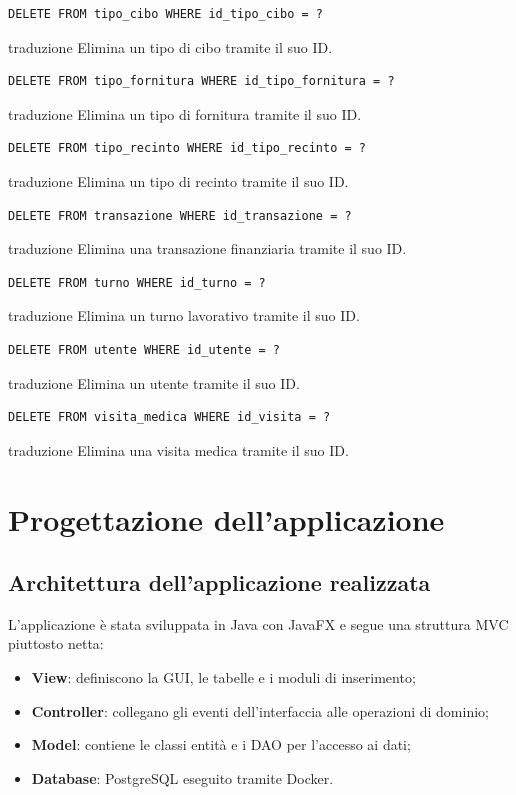 \documentclass[12pt,a4paper]{report}
\begin{document}
\begin{lstlisting}[style=sqlstyle]
DELETE FROM tipo_cibo WHERE id_tipo_cibo = ?
\end{lstlisting}
traduzione {Elimina un tipo di cibo tramite il suo ID.}

\begin{lstlisting}[style=sqlstyle]
DELETE FROM tipo_fornitura WHERE id_tipo_fornitura = ?
\end{lstlisting}
traduzione {Elimina un tipo di fornitura tramite il suo ID.}

\begin{lstlisting}[style=sqlstyle]
DELETE FROM tipo_recinto WHERE id_tipo_recinto = ?
\end{lstlisting}
traduzione {Elimina un tipo di recinto tramite il suo ID.}

\begin{lstlisting}[style=sqlstyle]
DELETE FROM transazione WHERE id_transazione = ?
\end{lstlisting}
traduzione {Elimina una transazione finanziaria tramite il suo ID.}

\begin{lstlisting}[style=sqlstyle]
DELETE FROM turno WHERE id_turno = ?
\end{lstlisting}
traduzione {Elimina un turno lavorativo tramite il suo ID.}

\begin{lstlisting}[style=sqlstyle]
DELETE FROM utente WHERE id_utente = ?
\end{lstlisting}
traduzione {Elimina un utente tramite il suo ID.}

\begin{lstlisting}[style=sqlstyle]
DELETE FROM visita_medica WHERE id_visita = ?
\end{lstlisting}
traduzione {Elimina una visita medica tramite il suo ID.}


\chapter{Progettazione dell'applicazione}

\section{Architettura dell'applicazione realizzata}

L'applicazione è stata sviluppata in Java con JavaFX e segue una struttura MVC
piuttosto netta:

\begin{itemize}[itemsep=2pt]
    \item \textbf{View}: definiscono la GUI, le tabelle e i moduli di inserimento;
    \item \textbf{Controller}: collegano gli eventi dell'interfaccia alle operazioni di dominio;
    \item \textbf{Model}: contiene le classi entità e i DAO per l'accesso ai dati;
    \item \textbf{Database}: PostgreSQL eseguito tramite Docker.
\end{itemize}
\end{document}
